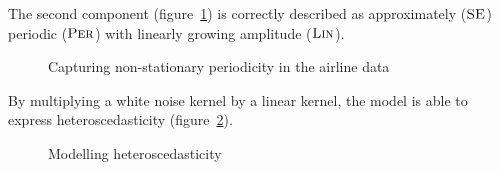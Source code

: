 \documentclass[letterpaper]{article}
\begin{document}
The second component (figure~\ref{fig:lin_periodic}) is correctly described as approximately (${\textsc{SE}}$) periodic (${\textsc{Per}}$) with linearly growing amplitude (${\textsc{Lin}}$).
%
\begin{figure}[h]
\centering
{}
\caption{Capturing non-stationary periodicity in the airline data}
\label{fig:lin_periodic}
\end{figure}
%
%
%
By multiplying a white noise kernel by a linear kernel, the model is able to express heteroscedasticity (figure~\ref{fig:heteroscedastic}).
%
\begin{figure}[h]
\centering
{}
\caption{Modelling heteroscedasticity}
\label{fig:heteroscedastic}
\end{figure}
\end{document}
